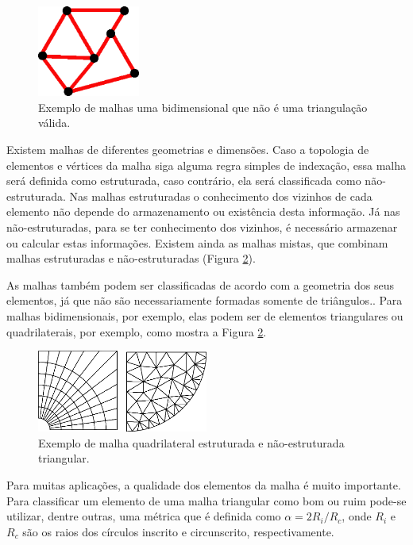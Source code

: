  \begin{figure}[htbp]
 	\centering
 	\includegraphics[width=0.3\textwidth]{fig/malha_invalida.png}
 	\caption{Exemplo de malhas uma bidimensional que não é uma triangulação válida.} 
 	\label{fig:malha_invalida}
 \end{figure}


Existem malhas de diferentes geometrias e dimensões. Caso a topologia de elementos e vértices da malha siga alguma regra simples de indexação, essa malha será definida como estruturada, caso contrário, ela será classificada como não-estruturada. Nas malhas estruturadas o conhecimento dos vizinhos de cada elemento não depende do armazenamento ou existência desta informação. Já nas não-estruturadas, para se ter conhecimento dos vizinhos, é necessário armazenar ou calcular estas informações. Existem ainda as malhas mistas, que combinam malhas estruturadas e não-estruturadas (Figura \ref{fig:est_e_n_est}).

As malhas também podem ser classificadas de acordo com a geometria dos seus elementos, já que não são necessariamente formadas somente de triângulos.. Para malhas bidimensionais, por exemplo, elas podem ser de elementos triangulares ou quadrilaterais, por exemplo, como mostra a Figura \ref{fig:est_e_n_est}.

 \begin{figure}[htbp]
     \centering
     \includegraphics[width=0.5\textwidth]{fig/est_e_n_est.png}
     \caption{Exemplo de malha quadrilateral estruturada e não-estruturada triangular.} 
     \label{fig:est_e_n_est}
 \end{figure}
 
Para muitas aplicações, a qualidade dos elementos da malha é muito importante. Para classificar um elemento de uma malha triangular como bom ou ruim pode-se utilizar, dentre outras, uma métrica que é definida como $ \alpha = 2R_i / R_c $, onde $R_i$ e $R_c$ são os raios dos círculos inscrito e circunscrito, respectivamente. 
 
